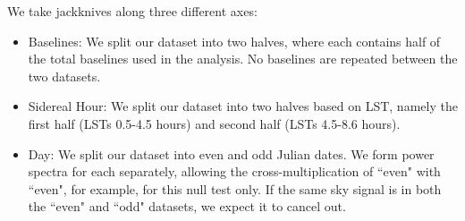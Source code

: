\documentclass[preprint2,numberedappendix,tighten]{aastex6}  %
\begin{document}
We take jackknives along three different axes:

\begin{itemize}
\item Baselines: We split our dataset into two halves, where each contains half of the total baselines used in the 
analysis. No baselines are repeated between the two datasets.
\item Sidereal Hour: We split our dataset into two halves based on LST, namely the first half (LSTs 0.5-4.5 hours) and second half (LSTs 
4.5-8.6 hours).
\item Day: We split our dataset into even and odd Julian dates. We form power spectra for each separately, allowing the cross-multiplication of ``even" with ``even", for example, for this null test only. If the same sky signal is in both the ``even" and ``odd" datasets, we expect it to cancel out. %
\end{itemize}
\end{document}
